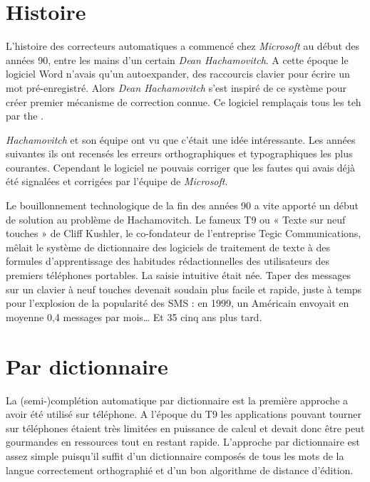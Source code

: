 \documentclass[final, 10pt]{report}
\begin{document}
\section{Histoire}

    L’histoire des correcteurs automatiques a commencé chez \emph{Microsoft} au début des années 90, entre les mains d’un certain \emph{Dean Hachamovitch}.
    A cette époque le logiciel Word n'avais qu'un \og autoexpander\fg{}, des raccourcis clavier pour écrire un mot pré-enregistré.
    Alors \emph{Dean Hachamovitch} s'est inspiré de ce système pour créer premier mécanisme de correction connue.
    Ce logiciel remplaçais tous les \og teh\fg{} par \og the \fg{}.
    
    \emph{Hachamovitch} et son équipe ont vu que c'était une idée intéressante.
    Les années suivantes ils ont recensés les erreurs orthographiques et typographiques les plus courantes.
    Cependant le logiciel ne pouvais corriger que les fautes qui avais déjà été signalées et corrigées par l'équipe de \emph{Microsoft}.
    
    
    Le bouillonnement technologique de la fin des années 90 a vite apporté un début de solution au problème de Hachamovitch. Le fameux T9 ou « Texte sur neuf touches » de Cliff Kushler, le co-fondateur de l’entreprise Tegic Communications, mêlait le système de dictionnaire des logiciels de traitement de texte à des formules d’apprentissage des habitudes rédactionnelles des utilisateurs des premiers téléphones portables. La saisie intuitive était née. Taper des messages sur un clavier à neuf touches devenait soudain plus facile et rapide, juste à temps pour l’explosion de la popularité des SMS : en 1999, un Américain envoyait en moyenne 0,4 messages par mois… Et 35 cinq ans plus tard.
    \cite{wesolowski_les_2021}


\section{Par dictionnaire}

    La (semi-)complétion automatique par dictionnaire est la première approche a avoir été utilisé sur téléphone.
    A l'époque du \og T9\fg{} les applications pouvant tourner sur téléphones étaient très limitées en puissance de calcul et devait donc être peut gourmandes en ressources tout en restant rapide. 
    L'approche par dictionnaire est assez simple puisqu'il suffit d'un dictionnaire composés de tous les mots de la langue correctement orthographié et d'un bon algorithme de distance d'édition.
    
\end{document}
